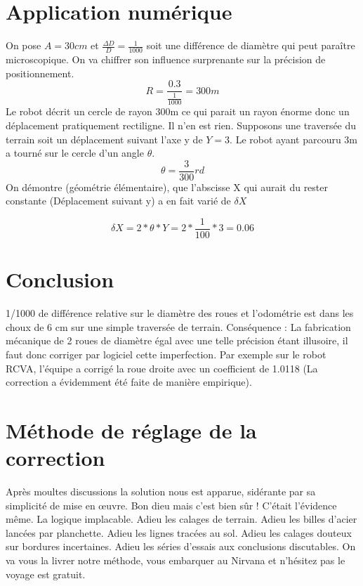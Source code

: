 \documentclass[a4paper]{report}
\begin{document}
\section{Application numérique}

On pose $A=30 cm$ et  $\frac{\Delta D}{D}=\frac{1}{1000}$ soit une différence de diamètre qui peut paraître microscopique. On va chiffrer son influence surprenante sur la précision de positionnement.
\begin{equation}
R=\frac{0.3}{\frac{1}{1000}}= 300m
\end{equation}
Le robot décrit un cercle de rayon 300m ce qui parait un rayon énorme donc un déplacement pratiquement rectiligne. Il n’en est rien.
Supposons une traversée du terrain soit un déplacement suivant l’axe y de $Y=3$.
Le robot ayant parcouru 3m a tourné sur le cercle d’un angle $\theta$.
\begin{equation}
\theta=\frac{3}{300} rd
\end{equation}
On démontre (géométrie élémentaire), que l’abscisse X qui aurait du rester constante (Déplacement suivant y) a en fait varié de $\delta X$ 

\begin{equation}
\delta X= 2*\theta*Y = 2 *\frac{1}{100}*3= 0.06
\end{equation}

\section{Conclusion} 
1/1000 de différence relative sur le diamètre des roues et l’odométrie est dans les choux de 6 cm sur une simple traversée de terrain.
Conséquence : La fabrication mécanique de 2 roues de diamètre égal avec une telle précision étant illusoire, il faut donc corriger par logiciel cette imperfection.
Par exemple sur le robot RCVA, l’équipe a corrigé la roue droite avec un coefficient de 1.0118 (La correction a évidemment été faite de manière empirique).

\section{Méthode de réglage de la correction}
Après moultes discussions la solution nous est apparue, sidérante par sa simplicité de mise en œuvre. Bon dieu mais c’est bien sûr ! C’était l’évidence même. La logique implacable. Adieu les calages de terrain. Adieu les billes d’acier lancées par planchette. Adieu les lignes tracées au sol. Adieu les calages douteux sur bordures incertaines. Adieu les séries d’essais aux conclusions discutables. 
On va vous la livrer notre méthode, vous embarquer au Nirvana et n’hésitez pas le voyage est gratuit.  
\end{document}

